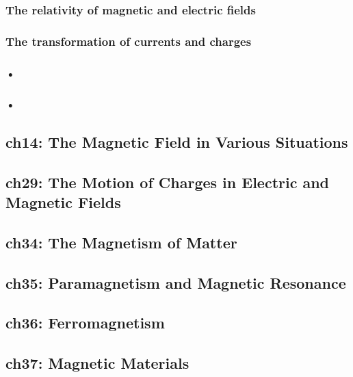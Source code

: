 \subsubsection{The relativity of magnetic and electric fields}
\subsubsection{The transformation of currents and charges}
\subsubsection{•}
\subsubsection{•}





























\subsection{ch14: The Magnetic Field in Various Situations}
\subsection{ch29: The Motion of Charges in Electric and Magnetic Fields}
\subsection{ch34: The Magnetism of Matter}
\subsection{ch35: Paramagnetism and Magnetic Resonance}
\subsection{ch36: Ferromagnetism}
\subsection{ch37: Magnetic Materials}
